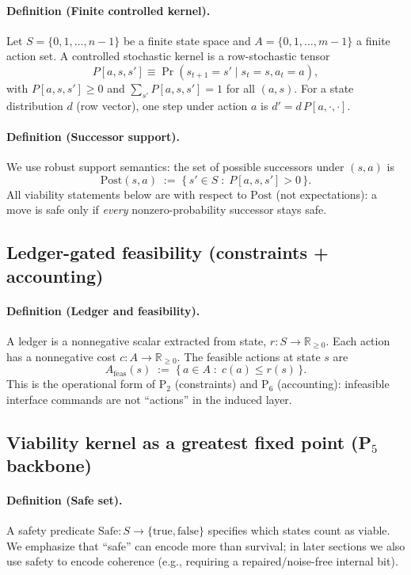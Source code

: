 \documentclass[11pt]{article}
\begin{document}
\paragraph{Definition (Finite controlled kernel).}
Let $S=\{0,1,\dots,n-1\}$ be a finite state space and $A=\{0,1,\dots,m-1\}$ a finite action set. A controlled stochastic kernel is a row-stochastic tensor
\[
P[a,s,s'] \equiv \Pr(s_{t+1}=s' \mid s_t=s, a_t=a),
\]
with $P[a,s,s']\ge 0$ and $\sum_{s'}P[a,s,s']=1$ for all $(a,s)$. For a state distribution $d$ (row vector), one step under action $a$ is $d' = d\,P[a,\cdot,\cdot]$.

\paragraph{Definition (Successor support).}
We use robust support semantics: the set of possible successors under $(s,a)$ is
\[
\mathrm{Post}(s,a) \;:=\; \{\, s' \in S \;:\; P[a,s,s']>0 \,\}.
\]
All viability statements below are with respect to $\mathrm{Post}$ (not expectations): a move is safe only if \emph{every} nonzero-probability successor stays safe.

\subsection{Ledger-gated feasibility (constraints + accounting)}
\paragraph{Definition (Ledger and feasibility).}
A ledger is a nonnegative scalar extracted from state, $r:S\to \mathbb{R}_{\ge 0}$. Each action has a nonnegative cost $c:A\to \mathbb{R}_{\ge 0}$. The feasible actions at state $s$ are
\[
A_{\mathrm{feas}}(s) \;:=\; \{\, a\in A \;:\; c(a)\le r(s)\,\}.
\]
This is the operational form of P$_2$ (constraints) and P$_6$ (accounting): infeasible interface commands are not ``actions'' in the induced layer.

\subsection{Viability kernel as a greatest fixed point (P$_5$ backbone)}
\paragraph{Definition (Safe set).}
A safety predicate $\mathrm{Safe}:S\to\{\text{true},\text{false}\}$ specifies which states count as viable. We emphasize that ``safe'' can encode more than survival; in later sections we also use safety to encode coherence (e.g., requiring a repaired/noise-free internal bit).
\end{document}
